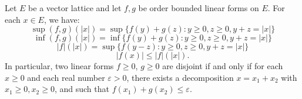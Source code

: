 Let $E$ be a vector lattice and let $f, g$ be order bounded linear forms on $E$. For each $x \in E$, we have:
$$\sup(f, g)(|x|) = \sup\{f(y) + g(z): y \geq 0, z \geq 0, y + z = |x|\}$$
$$\inf(f, g)(|x|) = \inf\{f(y) + g(z): y \geq 0, z \geq 0, y + z = |x|\}$$
$$|f|(|x|) = \sup\{f(y - z): y \geq 0, z \geq 0, y + z = |x|\}$$
$$|f(x)| \leq |f|(|x|).$$
In particular, two linear forms $f \geq 0$, $g \geq 0$ are disjoint if and only if for each $x \geq 0$ and each real number $\varepsilon > 0$, there exists a decomposition $x = x_1 + x_2$ with $x_1 \geq 0, x_2 \geq 0$, and such that $f(x_1) + g(x_2) \leq \varepsilon$.
